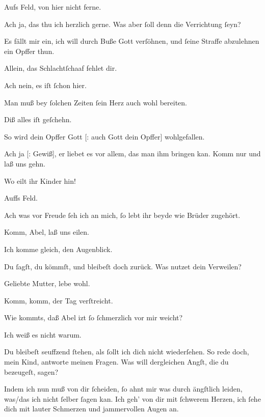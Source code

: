 \documentclass[tocstyle=ref-genre]{ees}
\begin{document}
{\begin{movement}{}
  \voice[Cain]
  Aufs Feld, von hier nicht ferne.

  \voice[Abel]
  Ach ja, das thu ich herzlich gerne.
  Was aber ſoll denn die Verrichtung ſeyn?

  \voice[Cain]
  Es fällt mir ein,
  ich will durch Buße Gott verſöhnen,
  und ſeine Straffe abzulehnen
  ein Opffer thun.

  \voice[Abel]
  Allein, das Schlachtſchaaf fehlet dir.

  \voice[Cain]
  Ach nein, es iſt ſchon hier.

  \voice[Abel]
  Man muß bey ſolchen Zeiten
  ſein Herz auch wohl bereiten.

  \voice[Cain]
  Diß alles iſt geſchehn.

  \voice[Abel]
  So wird dein Opffer Gott [: auch Gott dein Opffer] wohlgefallen.

  \voice[Cain]
  Ach ja [: Gewiß], er liebet es vor allem,
  das man ihm bringen kan. Komm nur und laß uns gehn.

  \voice[Eva]
  Wo eilt ihr Kinder hin!

  Auffs Feld.

  \voice[Eva]
  Ach was vor Freude
  ſeh ich an mich, ſo lebt ihr beyde
  wie Brüder zugehört.

  \voice[Cain]
  Komm, Abel, laß uns eilen.

  \voice[Abel]
  Ich komme gleich, den Augenblick.

  \voice[Cain]
  Du ſagſt, du kömmſt, und bleibeſt doch zurück.
  Was nutzet dein Verweilen?

  \voice[Abel]
  Geliebte Mutter, lebe wohl.

  \voice[Cain]
  Komm, komm, der Tag verſtreicht.

  \voice[Eva]
  Wie kommts, daß Abel izt ſo ſchmerzlich vor mir weicht?

  \voice[Abel]
  Ich weiß es nicht warum.

  \voice[Eva]
  Du bleibeſt seuffzend ſtehen,
  als ſollt ich dich nicht wiederſehen.
  So rede doch, mein Kind, antworte meinen Fragen.
  Was will dergleichen Angſt, die du bezeugeſt, sagen?
\end{movement}

\begin{movement}{}
  \voice[Abel]
  Indem ich nun muß von dir ſcheiden,
  ſo ahnt mir was durch ängſtlich leiden,
  was/das ich nicht ſelber ſagen kan.
  Ich geh’ von dir mit ſchwerem Herzen,
  ich ſehe dich mit lauter Schmerzen
  und jammervollen Augen an.
\end{movement}

}
\end{document}
